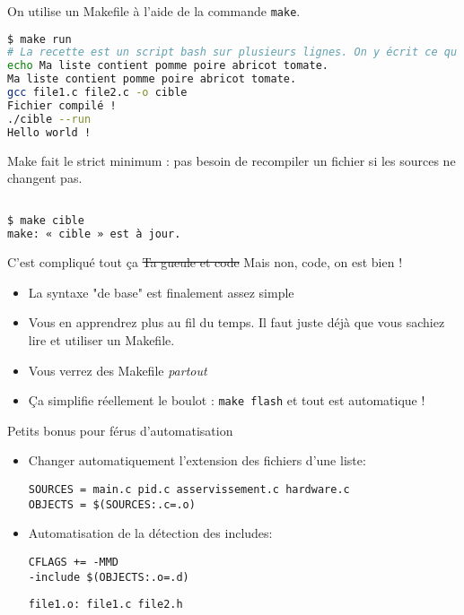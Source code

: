 \begin{frame}[fragile]
\frametitle{\insertsubsubsection}

On utilise un Makefile à l'aide de la commande \texttt{make}.

\begin{lstlisting}[language=bash]
$ make run
# La recette est un script bash sur plusieurs lignes. On y écrit ce qu'on veut.
echo Ma liste contient pomme poire abricot tomate.
Ma liste contient pomme poire abricot tomate.
gcc file1.c file2.c -o cible
Fichier compilé !
./cible --run
Hello world !
\end{lstlisting}



Make fait le strict minimum : pas besoin de recompiler un fichier si les sources ne changent pas.

\begin{lstlisting}[language=bash]

$ make cible
make: « cible » est à jour.
\end{lstlisting}
\end{frame}

\begin{frame}{C'est compliqué tout ça\…}
\sout{Ta gueule et code} Mais non, code, on est bien !

\begin{itemize}
  \item La syntaxe "de base" est finalement assez simple
  \item Vous en apprendrez plus au fil du temps. Il faut juste déjà que vous sachiez lire et utiliser un Makefile.
  \item Vous verrez des Makefile \textit{partout}
  \item Ça simplifie réellement le boulot : \texttt{make flash} et tout est automatique !
\end{itemize}

\end{frame}

\begin{frame}[fragile]{Petits bonus pour férus d'automatisation}
\begin{itemize}
\item Changer automatiquement l'extension des fichiers d'une liste:
\begin{lstlisting}
SOURCES = main.c pid.c asservissement.c hardware.c
OBJECTS = $(SOURCES:.c=.o)
\end{lstlisting}

\item Automatisation de la détection des includes:
\begin{lstlisting}[title=Makefile]
CFLAGS += -MMD
-include $(OBJECTS:.o=.d)
\end{lstlisting}
\medskip
\begin{lstlisting}[title=file1.d]
file1.o: file1.c file2.h

\end{lstlisting}
\end{itemize}
\end{frame}

